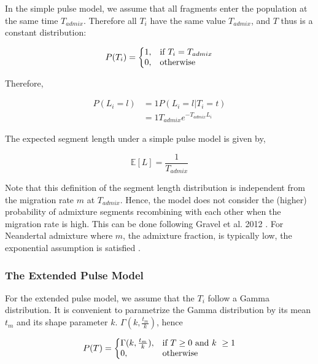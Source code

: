 \documentclass[]{article}
\begin{document}
In the simple pulse model, we assume that all fragments enter the population at the same time $T_{admix}$. Therefore all $T_i$ have the same value $T_{admix}$, and $T$ thus is a constant distribution:

\begin{equation}
\label{eq:RV_simple_pulse}
  P(T_i)=\left\{
  \begin{array}{@{}ll@{}}
    1, & \text{if}\ T_i=T_{admix} \\
    0, & \text{otherwise}
  \end{array}\right.
\end{equation} 

Therefore,

\begin{equation}
\begin{split}
\label{eq:Likelihood_function_simple_pulse}
    P(L_i=l) &=  1  P(L_i=l | T_i=t) \\
    &= 1 T_{admix}e^{-T_{admix}L_i}
\end{split}
\end{equation}

The expected segment length under a simple pulse model is given by,

\begin{equation}
\label{eq:Expected_l_simple_pulse}
    \mathbb{E}[L]=\frac{1}{T_{admix}}
\end{equation}

Note that this definition of the segment length distribution is independent from the migration rate $m$ at $T_{admix}$. Hence, the model does not consider the (higher) probability of admixture segments recombining with each other when the migration rate is high. This can be done following Gravel et al. 2012 \citep{gravel_population_2012}. For Neandertal admixture where $m$, the admixture fraction, is typically low, the exponential assumption is satisfied \citep{liang_lengths_2014}.

\subsubsection{The Extended Pulse Model}\label{The Extended Pulse Model}

For the extended pulse model, we assume that the $T_i$ follow a Gamma distribution. It is convenient to parametrize the Gamma distribution by its mean $t_m$ and its shape parameter $k$.  $\Gamma(k,\frac{t_m}{k})$, hence

\begin{equation}
\label{eq:RV_extended_pulse}
  P(T)=\left\{
  \begin{array}{@{}ll@{}}
    \Gamma(k,\frac{t_m}{k}), & \text{if}\ T\geq 0\ \text{and}\ k\ \geq 1\\
    0, & \text{otherwise}
  \end{array}\right.
\end{equation} 
\end{document}
